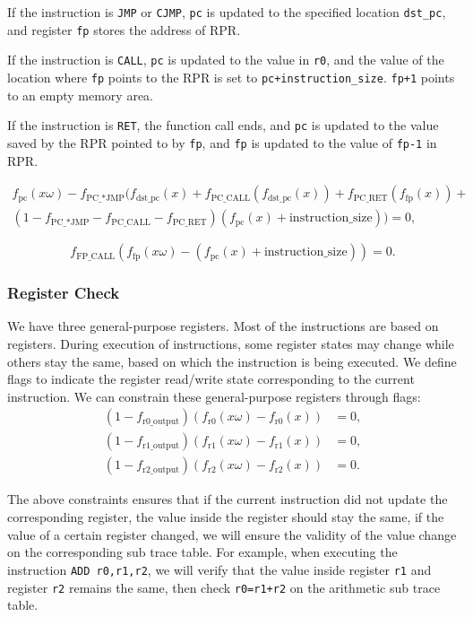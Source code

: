 If the instruction is \verb|JMP| or \verb|CJMP|, \verb|pc| is updated to the specified location \verb|dst_pc|, and register \verb|fp| stores the address of RPR.

If the instruction is \verb|CALL|, \verb|pc| is updated to the value in \verb|r0|, and the value of the location where \verb|fp| points to the RPR is set to \verb|pc+instruction_size|. \verb|fp+1| points to an empty memory area.

If the instruction is \verb|RET|, the function call ends, and \verb|pc| is updated to the value saved by the RPR pointed to by \verb|fp|, and \verb|fp| is updated to the value of \verb|fp-1| in RPR.

\begin{multline*}
    f_\text{pc}(x\omega) - f_\text{PC\_*JMP}(f_\text{dst\_{pc}}(x) + f_\text{PC\_CALL}(f_\text{dst\_{pc}}(x)) +f_\text{PC\_RET}(f_\text{fp}(x)) + \\
    (1 - f_\text{PC\_*JMP} - f_\text{PC\_CALL} - f_\text{PC\_RET})(f_\text{pc}(x) + \text{instruction\_size})) = 0,
\end{multline*}

\[ f_\text{FP\_CALL}(f_\text{fp}(x\omega) - (f_\text{pc}(x) + \text{instruction\_size})) = 0. \]

\subsubsection{Register Check}

We have three general-purpose registers. Most of the instructions are based on registers. During execution of instructions, some register states may change while others stay the same, based on which the instruction is being executed. We define flags to indicate the register read/write state corresponding to the current instruction. We can constrain these general-purpose registers through flags:
\begin{align*}
    (1 - f_\text{r0\_output})(f_\text{r0}(x\omega) - f_\text{r0}(x)) &= 0, \\
    (1 - f_\text{r1\_output})(f_\text{r1}(x\omega) - f_\text{r1}(x)) &= 0, \\
    (1 - f_\text{r2\_output})(f_\text{r2}(x\omega) - f_\text{r2}(x)) &= 0.
\end{align*}

The above constraints ensures that if the current instruction did not update the corresponding register, the value inside the register should stay the same, if the value of a certain register changed, we will ensure the validity of the value change on the corresponding sub trace table. For example, when executing the instruction \verb|ADD r0,r1,r2|, we will verify that the value inside register \verb|r1| and register \verb|r2| remains the same, then check \verb|r0=r1+r2| on the arithmetic sub trace table.

